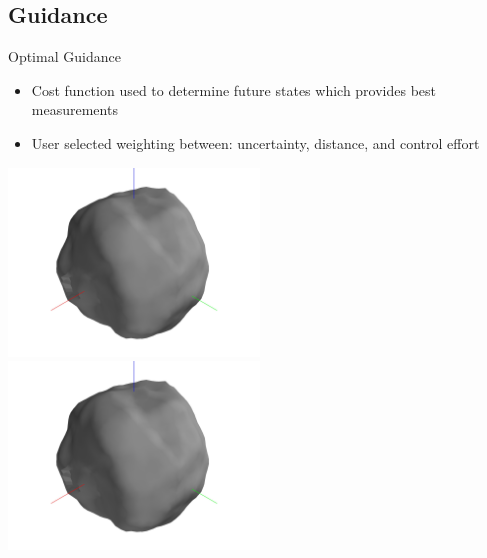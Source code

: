 \subsection{Guidance}
\begin{frame}{Optimal Guidance}
    \begin{itemize}
        \item Cost function used to determine future states which provides best measurements
        \item User selected weighting between: uncertainty, distance, and control effort
    \end{itemize}
\begin{center}
        \href{https://youtu.be/ZJY9nPXhyxw}{\includegraphics[trim={20cm 8cm 20cm 8cm},clip,keepaspectratio,width=0.5\textwidth,height=0.6\textheight]{figures/dynamic_exploration/52760/partial_14998.jpg}}%
        \href{https://youtu.be/VF8dp8D5nVA}{\includegraphics[trim={20cm 8cm 20cm 8cm},clip,keepaspectratio,width=0.5\textwidth,height=0.6\textheight]{figures/dynamic_exploration/52760/partial_14998.jpg}}
\end{center}
\end{frame}

